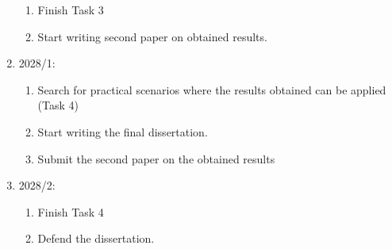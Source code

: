\documentclass[12pt]{article}
\begin{document}
\begin{enumerate}
\begin{enumerate}
    \item Finish Task 3
    \item Start writing second paper on obtained results.
    \end{enumerate}
\item 2028/1:  \begin{enumerate}
    \item Search for practical scenarios where the results obtained can be applied (Task 4)
    \item Start writing the final dissertation.
    \item Submit the second paper on the obtained results
    \end{enumerate}
\item 2028/2:  \begin{enumerate}
    \item Finish Task 4
    \item Defend the dissertation.
    \end{enumerate}
\end{enumerate}



\end{document}
